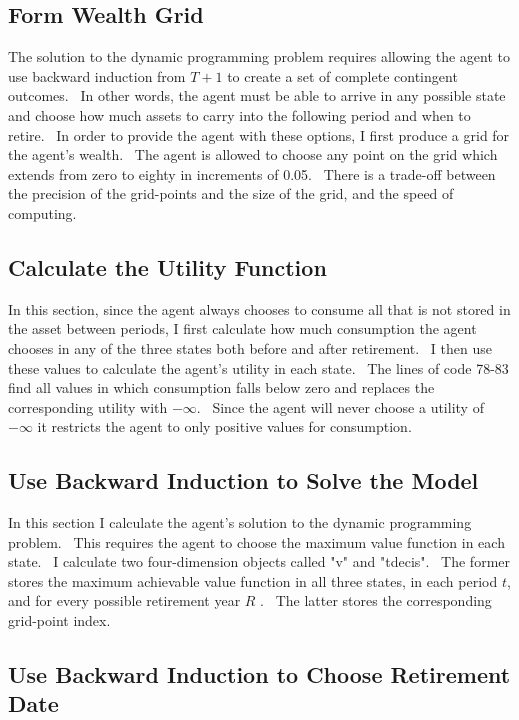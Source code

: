 \documentclass[12pt]{article}
\begin{document}
\subsection{Form Wealth Grid}

The solution to the dynamic programming problem requires allowing the agent
to use backward induction from $T+1$ to create a set of complete contingent
outcomes. \ In other words, the agent must be able to arrive in any possible
state and choose how much assets to carry into the following period and when
to retire. \ In order to provide the agent with these options, I first
produce a grid for the agent's wealth. \ The agent is allowed to choose any
point on the grid which extends from zero to eighty in increments of 0.05. \
There is a trade-off between the precision of the grid-points and the size
of the grid, and the speed of computing.

\subsection{Calculate the Utility Function}

In this section, since the agent always chooses to consume all that is not
stored in the asset between periods, I first calculate how much consumption
the agent chooses in any of the three states both before and after
retirement. \ I then use these values to calculate the agent's utility in
each state. \ The lines of code 78-83 find all values in which consumption
falls below zero and replaces the corresponding utility with $-\infty $. \
Since the agent will never choose a utility of $-\infty $ it restricts the
agent to only positive values for consumption. \ 

\subsection{Use Backward Induction to Solve the Model}

In this section I calculate the agent's solution to the dynamic programming
problem. \ This requires the agent to choose the maximum value function in
each state. \ I calculate two four-dimension objects called "v" and
"tdecis". \ The former stores the maximum achievable value function in all
three states, in each period $t$, and for every possible retirement year $R$%
. \ The latter stores the corresponding grid-point index. 

\subsection{Use Backward Induction to Choose Retirement Date}
\end{document}
